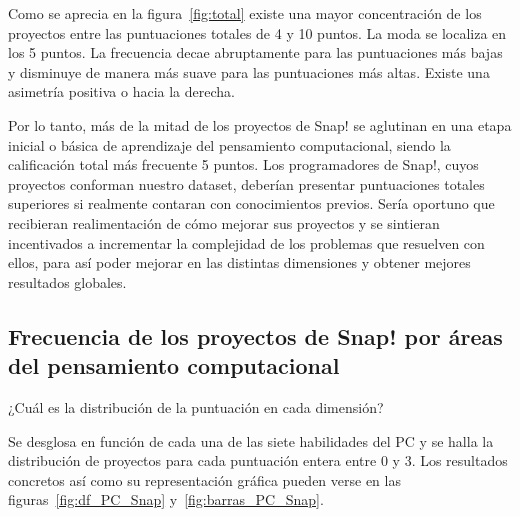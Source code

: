 \documentclass[a4paper, 12pt]{book}
\begin{document}
Como se aprecia en la figura~\ref{fig:total} existe una mayor concentración de los proyectos entre las puntuaciones totales de 4 y 10 puntos. La moda se localiza en los 5 puntos. La frecuencia decae abruptamente para las puntuaciones más bajas y disminuye de manera más suave para las puntuaciones más altas. Existe una asimetría positiva o hacia la derecha. %

Por lo tanto, más de la mitad de los proyectos de Snap! se aglutinan en una etapa inicial o básica de aprendizaje del pensamiento computacional, siendo la calificación total más frecuente 5 puntos. Los programadores de Snap!, cuyos proyectos conforman nuestro dataset, deberían presentar puntuaciones totales superiores si realmente contaran con conocimientos previos. Sería oportuno que recibieran realimentación de cómo mejorar sus proyectos y se sintieran incentivados a incrementar la complejidad de los problemas que resuelven con ellos, para así poder mejorar en las distintas dimensiones y obtener mejores resultados globales. 

\subsection{Frecuencia de los proyectos de Snap! por áreas del pensamiento computacional}
\label{subsec:frec_pc_Snap}

¿Cuál es la distribución de la puntuación en cada dimensión?

Se desglosa en función de cada una de las siete habilidades del PC y se halla la distribución de proyectos para cada puntuación entera entre 0 y 3. Los resultados concretos así como su representación gráfica pueden verse en las figuras~\ref{fig:df_PC_Snap} y~\ref{fig:barras_PC_Snap}. 
\end{document}
